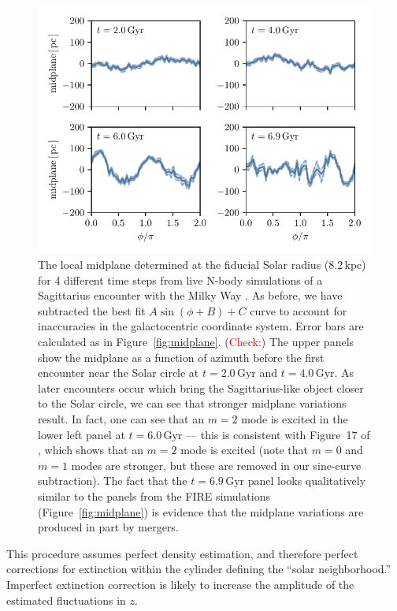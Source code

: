\documentclass[twocolumn]{aastex62}
\newcommand{\Gus}[1]{\textcolor{red}{#1}}
\newcommand{\kpc}{\text{kpc}}
\newcommand{\Gyr}{\text{Gyr}}
\begin{document}
\begin{figure}[htb!]
\begin{center}
\includegraphics[width=342.078286667pt]{fig/midplane_fit_chervinsim.pdf}
\end{center}
\caption{The local midplane determined at the fiducial Solar radius
($8.2\,\kpc$) for 4 different time steps from live N-body simulations of a
Sagittarius encounter with the Milky Way \citep{2018MNRAS.481..286L}. As
before, we have subtracted the best fit $A\sin{(\phi+B)}+C$ curve to account
for inaccuracies in the galactocentric coordinate system. Error bars are
calculated as in Figure~\ref{fig:midplane}. (\Gus{Check:}) The upper panels
show the midplane as a function of azimuth before the first encounter near the
Solar circle at $t=2.0\,\Gyr$ and $t=4.0\,\Gyr$. As later encounters occur
which bring the Sagittarius-like object closer to the Solar circle, we can see
that stronger midplane variations result. In fact, one can see that an $m=2$
mode is excited in the lower left panel at $t=6.0\,\Gyr$ --- this is
consistent with Figure~17 of \citet{2018MNRAS.481..286L}, which shows that an
$m=2$ mode is excited (note that $m=0$ and $m=1$ modes are stronger, but these
are removed in our sine-curve subtraction). The fact that the $t=6.9\,\Gyr$
panel looks qualitatively similar to the panels from the FIRE simulations
(Figure~\ref{fig:midplane}) is evidence that the midplane variations are
produced in part by mergers.}
\label{fig:midplane_chervin}
\end{figure}

This procedure assumes perfect density estimation, and therefore perfect
corrections for extinction within the cylinder defining the ``solar
neighborhood.'' Imperfect extinction correction is likely to increase the
amplitude of the estimated fluctuations in $z$.
\end{document}
